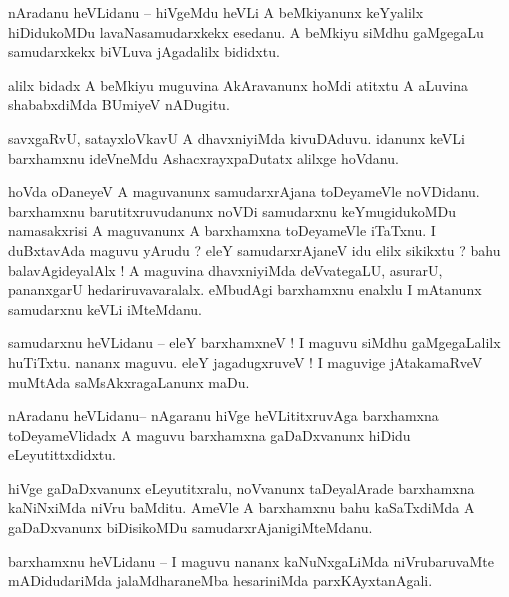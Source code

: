 \documentclass{article}
\begin{document}
\begin{mn}%
nAradanu heVLidanu -- hiVgeMdu heVLi A beMkiyanunx keYyalilx hiDidukoMDu lavaNasamudarxkekx 
esedanu. A beMkiyu siMdhu gaMgegaLu samudarxkekx biVLuva jAgadalilx bididxtu.
\end{mn}

\begin{mn}%
alilx bidadx A beMkiyu muguvina AkAravanunx hoMdi atitxtu A aLuvina shababxdiMda BUmiyeV nADugitu.
\end{mn}

\begin{mn}%
savxgaRvU, satayxloVkavU A dhavxniyiMda kivuDAduvu. idanunx keVLi barxhamxnu ideVneMdu 
AshacxrayxpaDutatx alilxge hoVdanu.
\end{mn}

\begin{mn}%
hoVda oDaneyeV A maguvanunx samudarxrAjana toDeyameVle noVDidanu. barxhamxnu barutitxruvudanunx 
noVDi samudarxnu keYmugidukoMDu namasakxrisi A maguvanunx A barxhamxna toDeyameVle iTaTxnu. I 
duBxtavAda maguvu yArudu ? eleY samudarxrAjaneV idu elilx sikikxtu ? bahu balavAgideyalAlx ! A 
maguvina dhavxniyiMda deVvategaLU, asurarU, pananxgarU hedariruvavaralalx. eMbudAgi barxhamxnu 
enalxlu I mAtanunx samudarxnu keVLi iMteMdanu.
\end{mn}

\begin{mn}%
samudarxnu heVLidanu -- eleY barxhamxneV ! I maguvu siMdhu gaMgegaLalilx huTiTxtu. nananx maguvu. 
eleY jagadugxruveV ! I maguvige jAtakamaRveV muMtAda saMsAkxragaLanunx maDu.
\end{mn}

\begin{mn}%
nAradanu heVLidanu-- nAgaranu hiVge heVLititxruvAga barxhamxna toDeyameVlidadx A maguvu barxhamxna 
gaDaDxvanunx hiDidu eLeyutittxdidxtu.
\end{mn}

\begin{mn}%
hiVge gaDaDxvanunx eLeyutitxralu, noVvanunx taDeyalArade barxhamxna kaNiNxiMda niVru baMditu. 
AmeVle A barxhamxnu bahu kaSaTxdiMda A gaDaDxvanunx biDisikoMDu samudarxrAjanigiMteMdanu.
\end{mn}

\begin{mn}%
barxhamxnu heVLidanu -- I maguvu nananx kaNuNxgaLiMda niVrubaruvaMte mADidudariMda jalaMdharaneMba 
hesariniMda parxKAyxtanAgali.
\end{mn}
\end{document}
